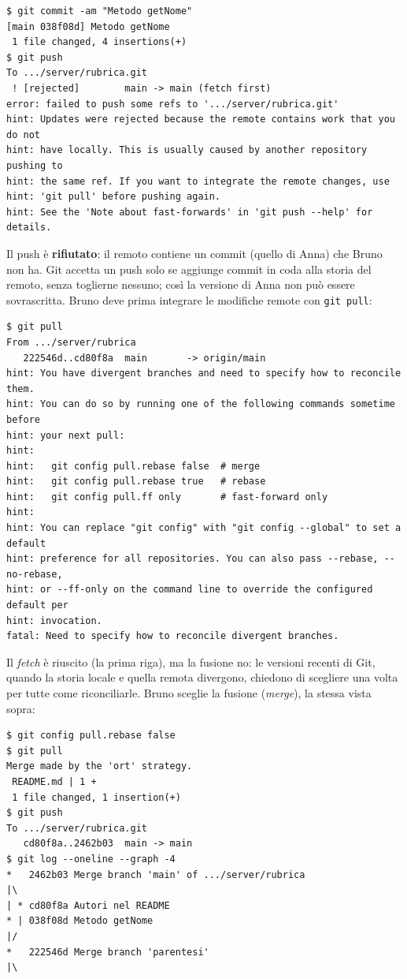 \begin{lstlisting}[style=shell, name=Terminale di Bruno, deletestring={[b]'}, deletekeywords={java}]
$ git commit -am "Metodo getNome"
[main 038f08d] Metodo getNome
 1 file changed, 4 insertions(+)
$ git push
To .../server/rubrica.git
 ! [rejected]        main -> main (fetch first)
error: failed to push some refs to '.../server/rubrica.git'
hint: Updates were rejected because the remote contains work that you do not
hint: have locally. This is usually caused by another repository pushing to
hint: the same ref. If you want to integrate the remote changes, use
hint: 'git pull' before pushing again.
hint: See the 'Note about fast-forwards' in 'git push --help' for details.
\end{lstlisting}

Il push è \textbf{rifiutato}: il remoto contiene un commit (quello di Anna) che Bruno non ha. Git accetta un push solo se
aggiunge commit in coda alla storia del remoto, senza toglierne nessuno; così la versione di Anna non può essere
sovrascritta. Bruno deve prima integrare le modifiche remote con \texttt{git pull}:

\begin{lstlisting}[style=shell, name=Terminale di Bruno, deletestring={[b]'}, deletekeywords={java}, deletecomment={[l]\#}]
$ git pull
From .../server/rubrica
   222546d..cd80f8a  main       -> origin/main
hint: You have divergent branches and need to specify how to reconcile them.
hint: You can do so by running one of the following commands sometime before
hint: your next pull:
hint:
hint:   git config pull.rebase false  # merge
hint:   git config pull.rebase true   # rebase
hint:   git config pull.ff only       # fast-forward only
hint:
hint: You can replace "git config" with "git config --global" to set a default
hint: preference for all repositories. You can also pass --rebase, --no-rebase,
hint: or --ff-only on the command line to override the configured default per
hint: invocation.
fatal: Need to specify how to reconcile divergent branches.
\end{lstlisting}

Il \textit{fetch} è riuscito (la prima riga), ma la fusione no: le versioni recenti di Git, quando la storia locale e
quella remota divergono, chiedono di scegliere una volta per tutte come riconciliarle. Bruno sceglie la fusione
(\textit{merge}), la stessa vista sopra:

\begin{lstlisting}[style=shell, name=Terminale di Bruno, deletestring={[b]'}, deletekeywords={java}]
$ git config pull.rebase false
$ git pull
Merge made by the 'ort' strategy.
 README.md | 1 +
 1 file changed, 1 insertion(+)
$ git push
To .../server/rubrica.git
   cd80f8a..2462b03  main -> main
$ git log --oneline --graph -4
*   2462b03 Merge branch 'main' of .../server/rubrica
|\
| * cd80f8a Autori nel README
* | 038f08d Metodo getNome
|/
*   222546d Merge branch 'parentesi'
|\
\end{lstlisting}

